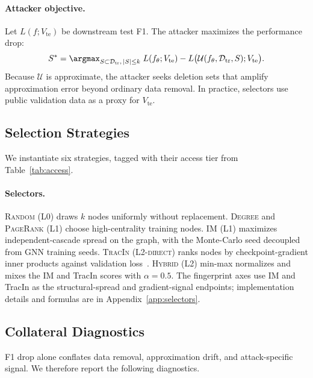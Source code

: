 \paragraph{Attacker objective.}
Let $L(f;V_{\mathrm{te}})$ be downstream test F1. The attacker maximizes
the performance drop:
\begin{equation}
\label{eq:attacker-objective}
S^* = \argmax_{S\subset\mathcal{D}_{\mathrm{tr}},\,|S|\le k}\;
      L(f_\theta;V_{\mathrm{te}})
      - L\bigl(\mathcal{U}(f_\theta,\mathcal{D}_{\mathrm{tr}},S);V_{\mathrm{te}}\bigr).
\end{equation}
Because $\mathcal{U}$ is approximate, the attacker seeks deletion sets
that amplify approximation error beyond ordinary data removal. In
practice, selectors use public validation data as a proxy for
$V_{\mathrm{te}}$.

\subsection{Selection Strategies}
\label{sec:strategies}

We instantiate six strategies, tagged with their access tier from
Table~\ref{tab:access}.

\paragraph{Selectors.}
\textsc{Random} (L0) draws $k$ nodes uniformly without replacement.
\textsc{Degree} and \textsc{PageRank} (L1) choose high-centrality
training nodes. \textsc{IM} (L1) maximizes independent-cascade spread on
the graph, with the Monte-Carlo seed decoupled from GNN training seeds.
\textsc{TracIn} (L2-\textsc{direct}) ranks nodes by checkpoint-gradient
inner products against validation loss~\cite{pruthi2020estimating}.
\textsc{Hybrid} (L2) min-max normalizes and mixes the IM and TracIn
scores with $\alpha{=}0.5$. The fingerprint axes use IM and TracIn as
the structural-spread and gradient-signal endpoints; implementation
details and formulas are in Appendix~\ref{app:selectors}.

\subsection{Collateral Diagnostics}
\label{sec:diagnostics}

F1 drop alone conflates data removal, approximation drift, and
attack-specific signal. We therefore report the following diagnostics.

